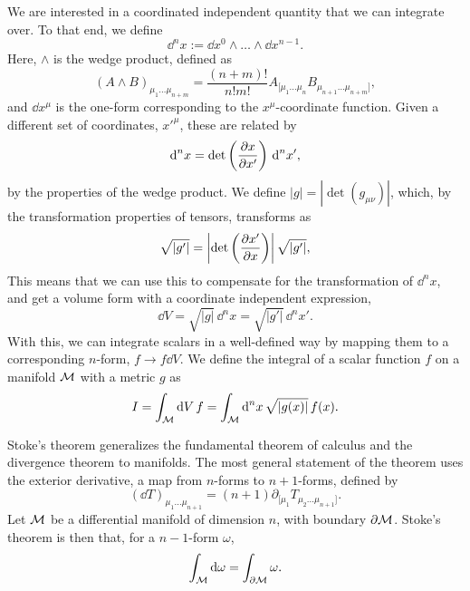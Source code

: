 We are interested in a coordinated independent quantity that we can integrate over.
To that end, we define
%
\begin{equation}
    \dd^n x := \dd x^0 \wedge \dots \wedge \dd x^{n-1}.
\end{equation}
%
Here, $\wedge$ is the wedge product, defined as
%
\begin{equation}
    (A\wedge B)_{\mu_1\dots\mu_{n+m}} = \frac{(n + m)!}{n! m!} A_{[\mu_1\dots\mu_n}B_{\mu_{n+1}\dots\mu_{n+m}]},
\end{equation}
%
and $\dd x^\mu$ is the one-form corresponding to the $x^\mu$-coordinate function.
Given a different set of coordinates, $x'^\mu$, these are related by
%
\begin{equation}
    \dd^n x = \det\left( \diffp{x}{x'} \right) \, \dd^n x',
\end{equation}
%
by the properties of the wedge product.
We define $|g| = |\det(g_{\mu \nu })|$, which, by the transformation properties of tensors, transforms as
%
\begin{equation}
    \sqrt{|g'|} = \left| \det\left(\diffp{x'}{x} \right) \right| \sqrt{|g'|},
\end{equation}
%
This means that we can use this to compensate for the transformation of $\dd^n x$, and get a volume form with a coordinate independent expression,
%
\begin{equation}
    \dd V = \sqrt{|g|} \, \dd^n x = \sqrt{|g'|} \, \dd^n x'.
\end{equation}
%
With this, we can integrate scalars in a well-defined way by mapping them to a corresponding $n$-form, $f \rightarrow f \dd V$.
We define the integral of a scalar function $f$ on a manifold $\mathcal{M}$ with a metric $g$ as
%
\begin{equation}
    I = \int_{\mathcal{M}} \text{d} V \, f =  \int_{\mathcal{M}} \text{d}^n x \, \sqrt{|g(x)|} \, f(x).  
\end{equation}


Stoke's theorem generalizes the fundamental theorem of calculus and the divergence theorem to manifolds.
The most general statement of the theorem uses the exterior derivative, a map from $n$-forms to $n+1$-forms, defined by
%
\begin{equation}
    (\dd T)_{\mu_1 \dots \mu_{n+1}} = (n+1) \partial_{[\mu_1} T_{\mu_2\dots\mu_{n+1}]}.
\end{equation}
%
Let $\mathcal{M}$ be a differential manifold of dimension $n$, with boundary $\partial \mathcal{M}$.
Stoke's theorem is then that, for a $n-1$-form $\omega$, 
%
\begin{equation}
    \int_{\mathcal{M}} \text{d} \omega = \int_{\partial \mathcal{M}}  \omega. 
\end{equation}

